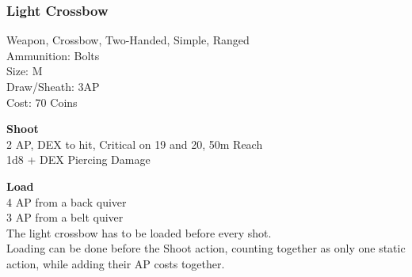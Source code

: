 \subsubsection{Light Crossbow}\label{weapon:lightCrossbow}
Weapon, Crossbow, Two-Handed, Simple, Ranged\\
Ammunition: Bolts\\
Size: M\\
Draw/Sheath: 3AP\\
Cost: 70 Coins

\textbf{Shoot} \\
2 AP, DEX to hit, Critical on 19 and 20, 50m Reach\\
1d8 + \texttimes DEX Piercing Damage

\textbf{Load} \\
4 AP from a back quiver\\
3 AP from a belt quiver\\
The light crossbow has to be loaded before every shot.\\
Loading can be done before the Shoot action, counting together as only one static action, while adding their AP costs together.\\